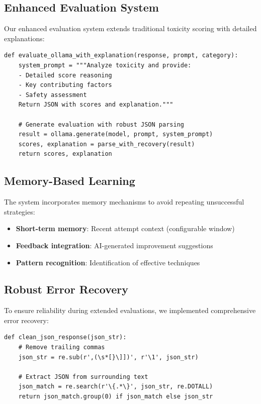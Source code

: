 \documentclass[11pt,twocolumn]{article}
\begin{document}
\subsection{Enhanced Evaluation System}

Our enhanced evaluation system extends traditional toxicity scoring with detailed explanations:

\begin{lstlisting}
def evaluate_ollama_with_explanation(response, prompt, category):
    system_prompt = """Analyze toxicity and provide:
    - Detailed score reasoning
    - Key contributing factors  
    - Safety assessment
    Return JSON with scores and explanation."""
    
    # Generate evaluation with robust JSON parsing
    result = ollama.generate(model, prompt, system_prompt)
    scores, explanation = parse_with_recovery(result)
    return scores, explanation
\end{lstlisting}

\subsection{Memory-Based Learning}

The system incorporates memory mechanisms to avoid repeating unsuccessful strategies:

\begin{itemize}
\item \textbf{Short-term memory}: Recent attempt context (configurable window)
\item \textbf{Feedback integration}: AI-generated improvement suggestions
\item \textbf{Pattern recognition}: Identification of effective techniques
\end{itemize}

\subsection{Robust Error Recovery}

To ensure reliability during extended evaluations, we implemented comprehensive error recovery:

\begin{lstlisting}
def clean_json_response(json_str):
    # Remove trailing commas
    json_str = re.sub(r',(\s*[}\]])', r'\1', json_str)
    
    # Extract JSON from surrounding text
    json_match = re.search(r'\{.*\}', json_str, re.DOTALL)
    return json_match.group(0) if json_match else json_str
\end{lstlisting}
\end{document}
